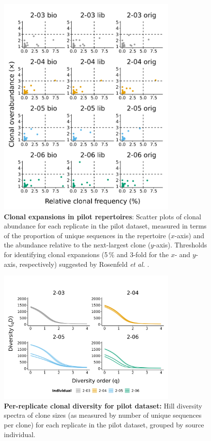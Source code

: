 \begin{figure}
\centering
\includegraphics[width=0.8\textwidth]{_Figures/png/pilot-clones-expansions-rep}
\caption[Clonal expansions in \Nfu pilot repertoires]{\textbf{Clonal expansions in \Nfu pilot repertoires}: Scatter plots of clonal abundance for each replicate in the pilot \igseq dataset, measured in terms of the proportion of unique sequences in the repertoire ($x$-axis) and the abundance relative to the next-largest clone ($y$-axis). Thresholds for identifying clonal expansions (5\,\% and 3-fold for the $x$- and $y$-axis, respectively) suggested by Rosenfeld \textit{et al.} \parencite{rosenfeld2018clonesize}.}
\label{fig:igseq-pilot-clones-expansions-rep}
\end{figure} %

\begin{figure}
\centering
\includegraphics[width = 0.8\textwidth]{_Figures/png/pilot-clone-diversity-solo-spectra}
\caption{\textbf{Per-replicate clonal diversity for pilot dataset:} Hill diversity spectra of clone sizes (as measured by number of unique sequences per clone) for each replicate in the \igseq pilot dataset, grouped by source individual.}
\label{fig:igseq-pilot-clone-diversity-solo-spectra}
\end{figure} %

